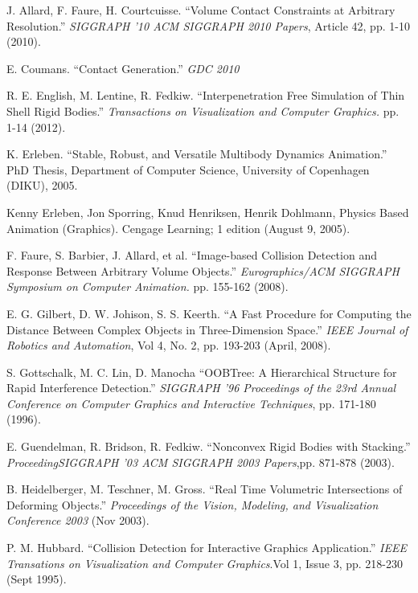 \documentclass[9pt,twocolumn]{article}
\begin{document}
\begin{thebibliography}{9}

 J. Allard, F. Faure, H. Courtcuisse. ``Volume Contact Constraints at Arbitrary Resolution.'' 
{\it SIGGRAPH '10 ACM SIGGRAPH 2010 Papers}, Article 42, pp. 1-10 (2010). 

 E. Coumans. ``Contact Generation.'' {\it GDC 2010}

 R. E. English, M. Lentine, R. Fedkiw. ``Interpenetration Free Simulation of Thin Shell Rigid Bodies.'' {\it Transactions on Visualization and Computer Graphics.} pp. 1-14 (2012). 

 K. Erleben. ``Stable, Robust, and Versatile Multibody Dynamics Animation.'' PhD Thesis, Department of Computer Science, University of Copenhagen (DIKU), 2005.

 Kenny Erleben, Jon Sporring, Knud Henriksen, Henrik Dohlmann, Physics Based Animation (Graphics). Cengage Learning; 1 edition (August 9, 2005).

 F. Faure, S. Barbier, J. Allard, et al. ``Image-based Collision Detection and Response Between Arbitrary Volume Objects.'' {\it Eurographics/ACM SIGGRAPH Symposium on Computer Animation.} pp. 155-162 (2008). 

 E. G. Gilbert, D. W. Johison, S. S. Keerth. ``A Fast Procedure for Computing the Distance Between Complex Objects in Three-Dimension Space.'' {\it IEEE Journal of Robotics and Automation}, Vol 4, No. 2, pp. 193-203 (April, 2008). 

 S. Gottschalk, M. C. Lin, D. Manocha ``OOBTree: A Hierarchical Structure for Rapid Interference Detection.'' {\it SIGGRAPH '96 Proceedings of the 23rd Annual Conference on Computer Graphics and Interactive Techniques}, pp. 171-180 (1996). 

 E. Guendelman, R. Bridson, R. Fedkiw. ``Nonconvex Rigid Bodies with Stacking.'' {\it ProceedingSIGGRAPH '03 ACM SIGGRAPH 2003 Papers},pp. 871-878 (2003).

 B. Heidelberger, M. Teschner, M. Gross. ``Real Time Volumetric Intersections of Deforming Objects.'' {\it Proceedings of the Vision, Modeling, and Visualization Conference 2003} (Nov 2003). 

 P. M. Hubbard. ``Collision Detection for Interactive Graphics Application.'' {\it IEEE Transations on Visualization and Computer Graphics}.Vol 1, Issue 3, pp. 218-230 (Sept 1995).


\end{thebibliography}
\end{document}
